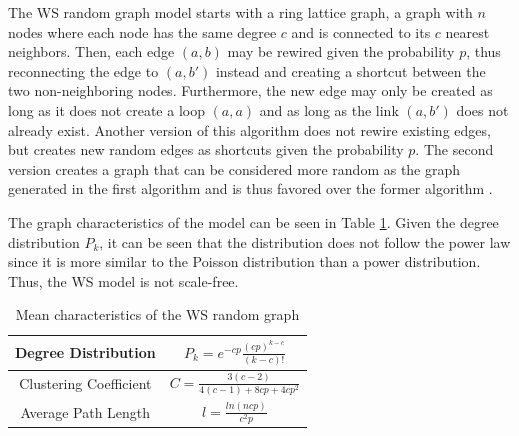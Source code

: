 The WS random graph model starts with a ring lattice graph, a graph 
with $n$ nodes where each node has the same degree $c$ and 
is connected to its $c$ nearest neighbors. Then, each edge $(a, b)$
may be rewired given the probability $p$, thus reconnecting the edge to  $(a, b')$
instead and creating a shortcut between the two non-neighboring nodes.
Furthermore, the new edge may only be created as long as it does not create
a loop $(a, a)$ and as long as the link $(a, b')$ does not already exist.
Another version of this algorithm does not rewire existing edges,
but creates new random edges as shortcuts given the probability $p$.
The second version creates a graph that can be considered more 
\glqq random\grqq{} as the graph generated in the first algorithm and is
thus favored over the former algorithm \cite{basicnetwork}.

The graph characteristics of the model can be seen
in Table \ref{ws-model}. Given the degree distribution $P_k$, it can be seen
that the distribution does not follow the power law since it is more similar
to the Poisson distribution than a power distribution. Thus, the WS model
is not scale-free.

\begin{table}[ht!]
    \centering
    \begin{tabular}{|c | c |} 
     \hline
     Degree Distribution & 
     $P_k = e^{-cp}\frac{(cp)^{k-c}}{(k-c)!}$ \\ 
     \hline
     Clustering Coefficient & 
     $C=\frac{3(c-2)}{4(c-1) + 8cp +4cp^2}$ \\ 
     \hline
     Average Path Length & $l = \frac{ln(ncp)}{c^2p}$ \\ 
     \hline
    \end{tabular}
    \caption{Mean characteristics of the WS random graph \cite{basicnetwork}}
    \label{ws-model}
\end{table}



